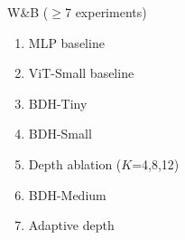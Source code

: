 \documentclass{beamer}
\begin{document}
\begin{frame}[fragile]
\begin{columns}
\begin{block}{W\&B ($\geq$7 experiments)}
\footnotesize
\begin{enumerate}
    \item MLP baseline
    \item ViT-Small baseline
    \item BDH-Tiny
    \item BDH-Small
    \item Depth ablation ($K$=4,8,12)
    \item BDH-Medium
    \item Adaptive depth
\end{enumerate}
\end{block}
\end{columns}

\end{frame}
\end{document}
